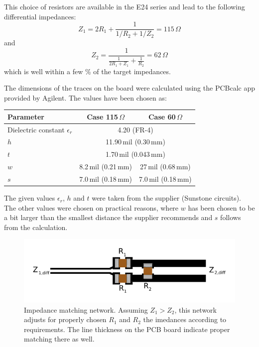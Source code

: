 This choice of resistors are available in the E24 series and lead to the following differential impedances:
\begin{equation}
Z_1 = 2R_1 + \frac{1}{1/R_2 + 1/Z_2} = 115\,\Omega
\end{equation}
and
\begin{equation}
Z_2 = \frac{1}{\frac{1}{2R_1+Z_1}+\frac{1}{R_2}} = 62\,\Omega
\end{equation}
which is well within a few \% of the target impedances.

The dimensions of the traces on the board were calculated using the PCBcalc app provided by Agilent. The values have been chosen as:
\begin{center}
\begin{tabular}{lcc}
    \toprule %
    Parameter & Case 115\,$\Omega$ & Case 60\,$\Omega$ \\
    \midrule %
    Dielectric constant $\epsilon_r$ & \multicolumn{2}{c}{4.20 (FR-4)} \\
    $h$ & \multicolumn{2}{c}{11.90\,mil (0.30\,mm)} \\
    $t$ & \multicolumn{2}{c}{1.70\,mil (0.043\,mm)} \\
    $w$ & 8.2\,mil (0.21\,mm) & 27\,mil (0.68\,mm) \\
    $s$ & 7.0\,mil (0.18\,mm) & 7.0\,mil (0.18\,mm) \\
    \bottomrule %
\end{tabular}
\end{center}
The given values $\epsilon_r$, $h$ and $t$ were taken from the supplier (Sunstone circuits). The other values were chosen on practical reasons, where $w$ has been chosen to be a bit larger than the smallest distance the supplier recommends and $s$ follows from the calculation.


\begin{figure}[hbtp]
	\begin{center}
	\includegraphics[width=.7\textwidth]{img/Impedmatch.pdf}
	\end{center}
	\caption{Impedance matching network. Assuming $Z_1>Z_2$, this network adjusts for properly chosen $R_1$ and $R_2$ the imedances according to requirements. The line thickness on the PCB board indicate proper matching there as well.}
	\label{fig:mpedmatch}
\end{figure}

